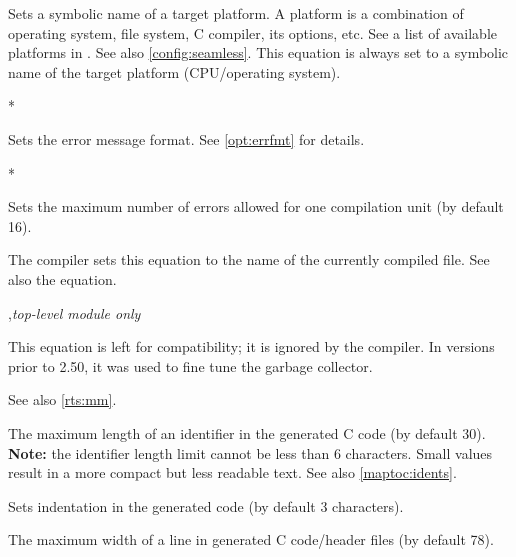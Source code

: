 \begin{description}
\ifgenc
        Sets a symbolic name of a target platform. A platform is a combination of
        operating system, file system, C compiler, its options, etc.
        See a list of available platforms in {\tt \cfg}. See also
        \ref{config:seamless}.
\fi
\ifgencode
        This equation is always set to a symbolic name of the target %
        platform (CPU/operating system).
\fi

        \MLBegin{}*\MLEnd{}

        Sets the error message format. See \ref{opt:errfmt} for
        details.

        \MLBegin{}*\MLEnd{}

        Sets the maximum number of errors allowed for
        one compilation unit (by default 16).

        \MLBegin{}\ModeC\MLEnd{}

        The compiler sets this equation to the name of the currently
        compiled file. See also the  equation.

        \MLBegin{}\ModeC{},{\em top-level module only}\MLEnd{}

        This equation is left for compatibility; it is ignored by
        the compiler. In versions prior to 2.50, it was used to fine tune
        the garbage collector. 

        See also \ref{rts:mm}.

\ifgenc
{}
        \MLBegin{}\ModeC{}\MLEnd{}

        The  maximum  length  of  an identifier in the
        generated C code (by default 30). {\bf Note:} the
        identifier length limit cannot be less than 6
        characters.  Small  values result in a more
        compact but less readable text.
        See also \ref{maptoc:idents}.
\fi

\ifgenc
{}
        \MLBegin{}\ModeC{}\MLEnd{}

        Sets indentation in the generated code
        (by default 3 characters).
\fi

\ifgenc
{}
        \MLBegin{}\ModeC{}\MLEnd{}

        The maximum width of a line in
        generated C code/header files (by default 78).


\end{description}
